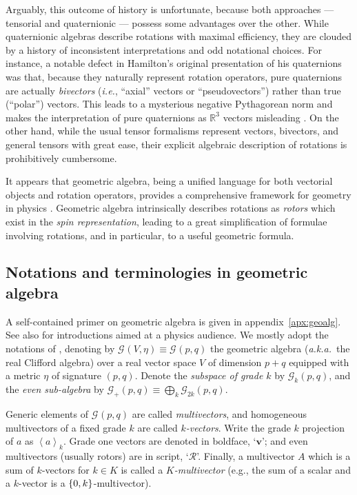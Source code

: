 \documentclass[12pt,a4paper]{article}
\makeatletter
\newcommand\x[1]{\@nameuse{\detokenize{#1}}}
\renewcommand{\vb}[1]{\boldsymbol{#1}}
\newcommand{\GA}[1][]{\mathcal{G}_{#1}}
\newcommand{\rotor}[1]{\mathcal{#1}}
\newcommand{\grade}[2][]{\left\langle#2\right\rangle_{#1}}
\newcommand{\RR}{\mathds{R}}
\makeatother
\begin{document}
Arguably, this outcome of history is unfortunate, because both approaches --- tensorial and quat\-ern\-ionic --- possess some advantages over the other.
While quaternionic algebras describe rotations with maximal efficiency, they are clouded by a history of inconsistent interpretations and odd notational choices.
For instance, a notable defect in Hamilton's original presentation of his quaternions was that, because they naturally represent rotation operators, pure quaternions are actually \emph{bivectors} (\emph{i.e.}, ``axial'' vectors or ``pseudovectors'') rather than true (``polar'') vectors.
This leads to a mysterious negative Pythagorean norm and makes the interpretation of pure quaternions as $\RR^3$ vectors misleading \cite{chappell2016quat-history}.
On the other hand, while the usual tensor formalisms represent vectors, bivectors, and general tensors with great ease, their explicit algebraic description of rotations is prohibitively cumbersome.

It appears that geometric algebra, being a unified language for both vectorial objects and rotation operators, provides a comprehensive framework for geometry in physics \cite{chappell2016quat-history,doran2003ga,doran1994ga,lasenby2016ga-unified-language,hestenes1986ga-unified-language,gull1993sta}.
Geometric algebra intrinsically describes rotations as \emph{rotors} which exist in the \emph{spin representation}, leading to a great simplification of formulae involving rotations, and in particular, to a useful geometric \x{BCH} formula.


\subsection{Notations and terminologies in geometric algebra}

A self-contained primer on geometric algebra is given in appendix~\ref{apx:geoalg}.
See also \cite{hestenes2003sta,doran2003ga,lasenby2016ga-unified-language} for introductions aimed at a physics audience.
We mostly adopt the notations of \cite{doran2003ga}, denoting by $\GA(V, \eta{}) \equiv{} \GA(p, q)$ the geometric algebra (\emph{a.k.a.}~the real Clifford algebra) over a real vector space $V$ of dimension $p + q$ equipped with a metric $\eta{}$ of signature $(p, q)$.
Denote the \emph{subspace of grade $k$} by $\GA[k](p, q)$, and the \emph{even sub-algebra} by $\GA[+](p, q) \equiv{} \bigoplus_{k}\GA[2k](p, q)$.

Generic elements of $\GA(p,q)$ are called \emph{multivectors}, and homogeneous multivectors of a fixed grade $k$ are called \emph{$k$-vectors}.
Write the grade $k$ projection of $a$ as $\grade[k]{a}$.
Grade one vectors are denoted in boldface, `$\vb{v}{}$'; and even multivectors (usually rotors) are in script, `$\rotor R$'.
Finally, a multivector $A$ which is a sum of $k$-vectors for $k \in K$ is called a \emph{$K$-multivector} (e.g., the sum of a scalar and a $k$-vector is a $\qty{0, k}$-multivector).
\end{document}
